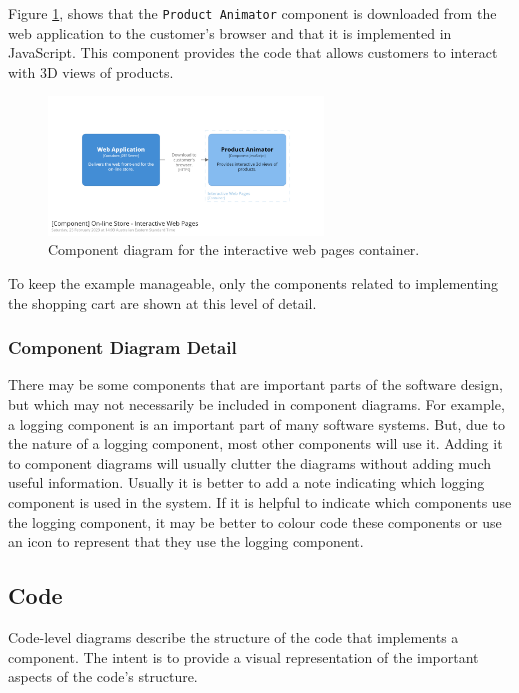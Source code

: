 \noindent
Figure \ref{fig:c4_component_browser}, shows that the \texttt{Product Animator} component
is downloaded from the web application to the customer's browser and that it is implemented in JavaScript.
This component provides the code that allows customers to interact with 3D views of products.

\begin{figure}[h!]
    \centering
    \includegraphics[trim=200 190 195 190,clip,width=0.65\textwidth]{images/c4/browser_component_diagram.png}
    \caption{Component diagram for the interactive web pages container.}
    \label{fig:c4_component_browser}
\end{figure}

\noindent
To keep the example manageable, only the components related to implementing the shopping cart are shown at this level of detail.

\subsubsection{Component Diagram Detail}
There may be some components that are important parts of the software design,
but which may not necessarily be included in component diagrams.
For example, a logging component is an important part of many software systems.
But, due to the nature of a logging component, most other components will use it.
Adding it to component diagrams will usually clutter the diagrams without adding much useful information.
Usually it is better to add a note indicating which logging component is used in the system.
If it is helpful to indicate which components use the logging component,
it may be better to colour code these components or use an icon to represent that they use the logging component.

\subsection{Code}
Code-level diagrams describe the structure of the code that implements a component.
The intent is to provide a visual representation of the important aspects of the code's structure.

